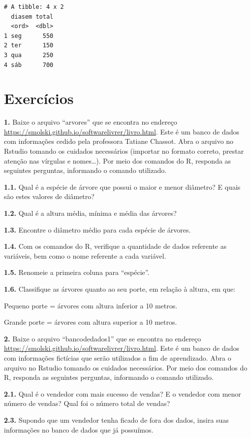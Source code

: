 \documentclass[12pt,brazil,oneside]{book}
\begin{document}
\begin{verbatim}
# A tibble: 4 x 2
  diasem total
  <ord>  <dbl>
1 seg      550
2 ter      150
3 qua      250
4 sáb      700
\end{verbatim}

\hypertarget{exercicios}{%
\section{Exercícios}\label{exercicios}}

\textbf{1.} Baixe o arquivo ``arvores'' que se encontra no endereço \url{https://smolski.github.io/softwarelivrer/livro.html}. Este é um banco de dados com informações cedido pela professora Tatiane Chassot. Abra o arquivo no Rstudio tomando os cuidados necessários (importar no formato correto, prestar atenção nas vírgulas e nomes\ldots{}). Por meio dos comandos do R, responda as seguintes perguntas, informando o comando utilizado.

\textbf{1.1.} Qual é a espécie de árvore que possui o maior e menor diâmetro? E quais são estes valores de diâmetro?

\textbf{1.2.} Qual é a altura média, mínima e média das árvores?

\textbf{1.3.} Encontre o diâmetro médio para cada espécie de árvores.

\textbf{1.4.} Com os comandos do R, verifique a quantidade de dados referente as variáveis, bem como o nome referente a cada variável.

\textbf{1.5.} Renomeie a primeira coluna para ``espécie''.

\textbf{1.6.} Classifique as árvores quanto ao seu porte, em relação à altura, em que:

Pequeno porte = árvores com altura inferior a 10 metros.

Grande porte = árvores com altura superior a 10 metros.

\textbf{2.} Baixe o arquivo ``bancodedados1'' que se encontra no endereço \url{https://smolski.github.io/softwarelivrer/livro.html}. Este é um banco de dados com informações fictícias que serão utilizados a fim de aprendizado. Abra o arquivo no Rstudio tomando os cuidados necessários. Por meio dos comandos do R, responda as seguintes perguntas, informando o comando utilizado.

\textbf{2.1.} Qual é o vendedor com mais sucesso de vendas? E o vendedor com menor número de vendas?
Qual foi o número total de vendas?

\textbf{2.3.} Supondo que um vendedor tenha ficado de fora dos dados, insira suas informações no banco de dados que já possuímos.
\end{document}
